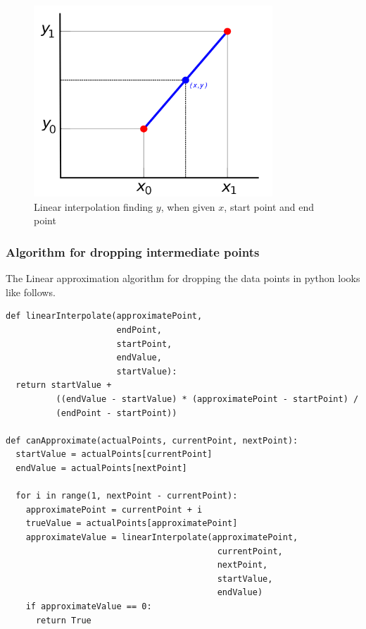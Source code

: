 \documentclass[12pt]{article}
\begin{document}
{\begin{figure}[H]
  \centering
  \includegraphics[width=0.8\textwidth]{linear_interpolation}
  \caption{Linear interpolation finding $y$, when given $x$, start point and end point ~\cite{linear_interpolation}}
  \label{fig:linear_interpolation}
\end{figure}

\subsubsection{Algorithm for dropping intermediate points}

The Linear approximation algorithm for dropping the data points in python looks like follows.

\begin{lstlisting}
def linearInterpolate(approximatePoint,
                      endPoint,
                      startPoint,
                      endValue,
                      startValue):
  return startValue +
          ((endValue - startValue) * (approximatePoint - startPoint) /
          (endPoint - startPoint))

def canApproximate(actualPoints, currentPoint, nextPoint):
  startValue = actualPoints[currentPoint]
  endValue = actualPoints[nextPoint]

  for i in range(1, nextPoint - currentPoint):
    approximatePoint = currentPoint + i
    trueValue = actualPoints[approximatePoint]
    approximateValue = linearInterpolate(approximatePoint,
                                          currentPoint,
                                          nextPoint,
                                          startValue,
                                          endValue)
    if approximateValue == 0:
      return True


\end{lstlisting}}
\end{document}
